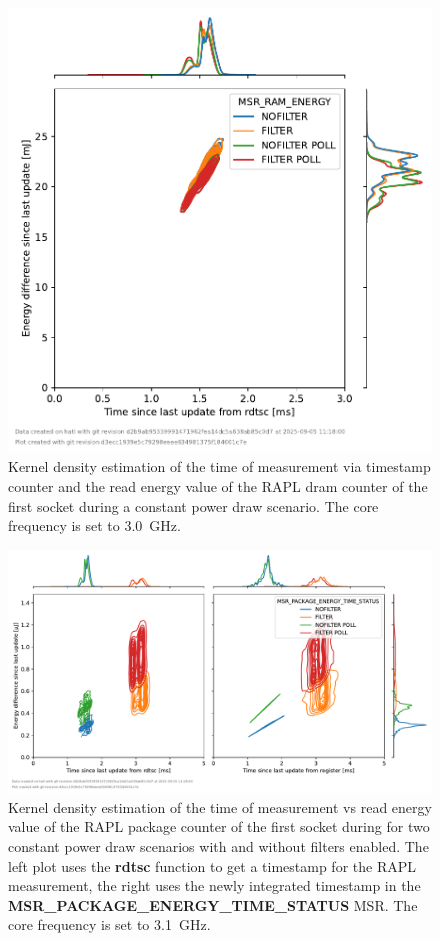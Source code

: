 \begin{figure}[]
    \centering
    \includegraphics[width=0.54\columnwidth]{fig/rapl-update-intervals/MSR_RAM_ENERGY_3000000.pdf}
    \caption{Kernel density estimation of the time of measurement via timestamp counter and the read energy value of the RAPL dram counter of the first socket during a constant power draw scenario.
    The core frequency is set to \SI{3.0}{\GHz}.}
\end{figure}

\clearpage
\begin{figure}[]
    \centering
    \includegraphics[width=\columnwidth]{fig/rapl-update-intervals/MSR_PACKAGE_ENERGY_TIME_STATUS_3100000.pdf}
    \caption{Kernel density estimation of the time of measurement vs read energy value of the RAPL package counter of the first socket during for two constant power draw scenarios with and without filters enabled.
    The left plot uses the \textbf{rdtsc} function to get a timestamp for the RAPL measurement, the right uses the newly integrated timestamp in the \textbf{MSR\_PACKAGE\_ENERGY\_TIME\_STATUS} MSR.
    The core frequency is set to \SI{3.1}{\GHz}.}
\end{figure}


